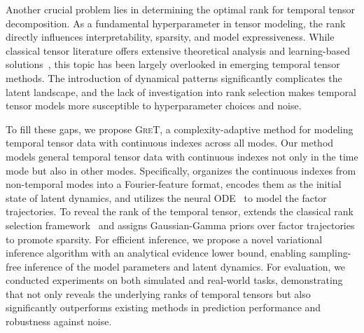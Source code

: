 Another crucial problem lies in determining the optimal rank for temporal tensor decomposition. As a fundamental hyperparameter in tensor modeling, the rank directly influences interpretability, sparsity, and model expressiveness. While classical tensor literature offers extensive theoretical analysis and learning-based solutions~\citep{zhao2015bayesianCP,cheng2022towards,pmlr-v32-rai14}, this topic has been largely overlooked in emerging temporal tensor methods. The introduction of dynamical patterns significantly complicates the latent landscape, and the lack of investigation into rank selection makes temporal tensor models more susceptible to hyperparameter choices and noise.

To fill these gaps, we propose 
\textsc{GreT}, a complexity-adaptive method for modeling temporal tensor data with continuous indexes across all modes.
Our method models general temporal tensor data with continuous indexes not only in the time mode but also in other modes. Specifically, \MODEL organizes the continuous indexes from non-temporal modes  into a Fourier-feature format, encodes them as the initial state of latent dynamics, and utilizes the neural ODE~\citep{chen2018neural} to model the factor trajectories.
To reveal the rank of the temporal tensor, \MODEL extends the classical rank selection framework~\citep{zhao2015bayesianCP} and assigns Gaussian-Gamma priors over factor trajectories to promote sparsity. For efficient inference, we propose a novel variational inference algorithm with an analytical evidence lower bound, enabling sampling-free inference  of the model parameters and latent dynamics.
For evaluation, we conducted experiments on both simulated and real-world tasks, demonstrating that \MODEL not only reveals the underlying ranks of temporal tensors but also significantly outperforms existing methods in prediction performance and robustness against noise.